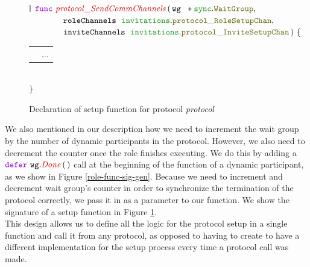 \documentclass[12pt,twoside]{report}
\begin{document}
\begin{figure}[!h]
    \begin{center}
        \begin{tabular}{l}
            $\gofunc\ \functionname{protocol\_SendCommChannels} \, (\,\varname{wg}\ \;*\pkgstructaccess{sync}{WaitGroup},$\\
            
            $\qquad \qquad \varname{roleChannels}\ \;\pkgstructaccess{invitations}{protocol\_RoleSetupChan},$\\

            $\qquad \qquad \varname{inviteChannels}\ \;\pkgstructaccess{invitations}{protocol\_InviteSetupChan}\,)\ \{$\\[3pt]

            \begin{tabular}{ll}
                \indent & $\dots$\\[3.5pt]
            \end{tabular}\\[3pt]
            $\}$
        \end{tabular}
    \end{center}
    \caption{Declaration of setup function for protocol \textit{protocol}}
    \label{protocol-setup-func-gen}
\end{figure}

We also mentioned in our description how we need to increment the wait group by the number of dynamic participants in the protocol. However, we also need to decrement the counter once the role finishes executing. We do this by adding a $\godefer\ \methodcall{wg}{Done}\,(\,)$ call at the beginning of the function of a dynamic participant, as we show in Figure \ref{role-func-sig-gen}. Because we need to increment and decrement wait group's counter in order to synchronize the termination of the protocol correctly, we pass it in as a parameter to our function. We show the signature of a setup function in Figure \ref{protocol-setup-func-gen}.\\

This design allows us to define all the logic for the protocol setup in a single function and call it from any protocol, as opposed to having to create to have a different implementation for the setup process every time a protocol call was made.
\end{document}
